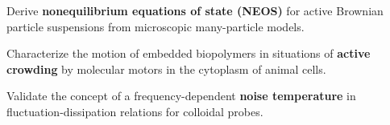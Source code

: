 \begin{workpackage}[id=WPactive,wphases=0-48,
  short=Active Particle Suspensions,%
  title=Probing active particle suspensions with colloids and polymers,
  lead=ULEI,
  ULEIRM=96,UNIPDRM=6,USTUTTRM=2]

\newrefsection

\begin{wpobjectives}
  \begin{compactitem}
  \item Derive \textbf{nonequilibrium equations of state (NEOS)} for active Brownian
  particle suspensions from microscopic many-particle models.
  \item Characterize the motion of embedded biopolymers in situations of \textbf{active
    crowding} by molecular motors in the cytoplasm of animal cells.
  \item Validate the concept of a frequency-dependent \textbf{noise temperature} in
  fluctuation-dissipation relations for colloidal probes.
  \end{compactitem}
\end{wpobjectives}


\end{workpackage}
